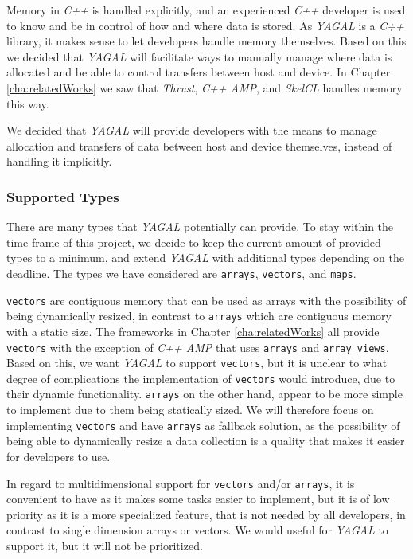 Memory in \textit{C++} is handled explicitly, and an experienced \textit{C++} developer is used to know and be in control of how and where data is stored. As \textit{YAGAL} is a \textit{C++} library, it makes sense to let developers handle memory themselves. Based on this we decided that \textit{YAGAL} will facilitate ways to manually manage where data is allocated and be able to control transfers between host and device. In Chapter \ref{cha:relatedWorks} we saw that \textit{Thrust}, \textit{C++ AMP}, and \textit{SkelCL} handles memory this way.

We decided that \textit{YAGAL} will provide developers with the means to manage allocation and transfers of data between host and device themselves, instead of handling it implicitly.

\subsubsection{Supported Types}
There are many types that \textit{YAGAL} potentially can provide. To stay within the time frame of this project, we decide to keep the current amount of provided types to a minimum, and extend \textit{YAGAL} with additional types depending on the deadline. The types we have considered are \texttt{arrays}, \texttt{vectors}, and \texttt{maps}.

\texttt{vectors} are contiguous memory that can be used as arrays with the possibility of being dynamically resized, in contrast to \texttt{arrays} which are contiguous memory with a static size. The frameworks in Chapter \ref{cha:relatedWorks} all provide \texttt{vectors} with the exception of \textit{C++ AMP} that uses \texttt{arrays} and \texttt{array\_views}. Based on this, we want \textit{YAGAL} to support \texttt{vectors}, but it is unclear to what degree of complications the implementation of \texttt{vectors} would introduce, due to their dynamic functionality. \texttt{arrays} on the other hand, appear to be more simple to implement due to them being statically sized. We will therefore focus on implementing \texttt{vectors} and have \texttt{arrays} as fallback solution, as the possibility of being able to dynamically resize a data collection is a quality that makes it easier for developers to use.

In regard to multidimensional support for \texttt{vectors} and/or \texttt{arrays}, it is convenient to have as it makes some tasks easier to implement, but it is of low priority as it is a more specialized feature, that is not needed by all developers, in contrast to single dimension arrays or vectors. We would useful for \textit{YAGAL} to support it, but it will not be prioritized.

